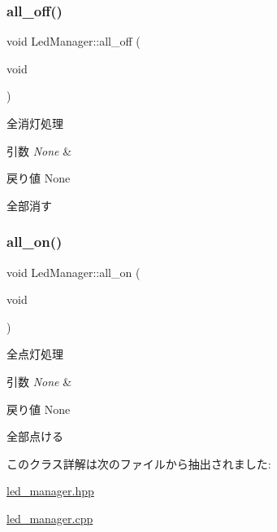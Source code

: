 \subsubsection{\texorpdfstring{all\_off()}{all\_off()}}
{\footnotesize\ttfamily void Led\+Manager\+::all\+\_\+off (\begin{DoxyParamCaption}\item[{void}]{ }\end{DoxyParamCaption})}



全消灯処理 


\begin{DoxyParams}{引数}
{\em None} & \\
\hline
\end{DoxyParams}
\begin{DoxyReturn}{戻り値}
None
\end{DoxyReturn}
全部消す \mbox{\label{class_led_manager_a28303e2b12fbac168e9026a128977081}} 
\subsubsection{\texorpdfstring{all\_on()}{all\_on()}}
{\footnotesize\ttfamily void Led\+Manager\+::all\+\_\+on (\begin{DoxyParamCaption}\item[{void}]{ }\end{DoxyParamCaption})}



全点灯処理 


\begin{DoxyParams}{引数}
{\em None} & \\
\hline
\end{DoxyParams}
\begin{DoxyReturn}{戻り値}
None
\end{DoxyReturn}
全部点ける 

このクラス詳解は次のファイルから抽出されました\+:\begin{DoxyCompactItemize}
\item 
\mbox{\hyperlink{led__manager_8hpp}{led\+\_\+manager.\+hpp}}\item 
\mbox{\hyperlink{led__manager_8cpp}{led\+\_\+manager.\+cpp}}\end{DoxyCompactItemize}
